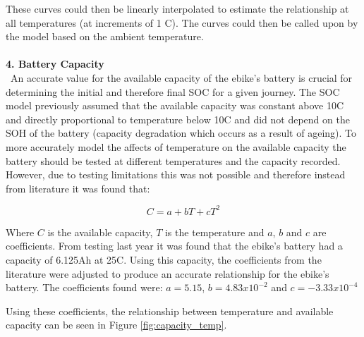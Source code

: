 \documentclass[a4paper, 10pt]{article}
\numberwithin{equation}{section}
\begin{document}
These curves could then be linearly interpolated to estimate the relationship at all temperatures (at increments of 1 \degree C). The curves could then be called upon by the model based on the ambient temperature.
\\
\\
\textbf{4. Battery Capacity}
\\
\
An accurate value for the available capacity of the ebike's battery is crucial for determining the initial and therefore final SOC for a given journey. The SOC model previously assumed that the available capacity was constant above 10\degree C and directly proportional to temperature below 10\degree C and did not depend on the SOH of the battery (capacity degradation which occurs as a result of ageing). To more accurately model the affects of temperature on the available capacity the battery should be tested at different temperatures and the capacity recorded. However, due to testing limitations this was not possible and therefore instead from literature it was found that:

\begin{equation}
    C = a + bT + cT^{2}
\end{equation}

Where $C$ is the available capacity, $T$ is the temperature and $a$, $b$ and $c$ are coefficients.
From testing last year it was found that the ebike's battery had a capacity of 6.125Ah at 25\degree C. Using this capacity, the coefficients from the literature were adjusted to produce an accurate relationship for the ebike's battery. The coefficients found were: $a=5.15$, $b=4.83x10^{-2}$ and $c=-3.33x10^{-4}$

Using these coefficients, the relationship between temperature and available capacity can be seen in Figure \ref{fig:capacity_temp}.
\end{document}
